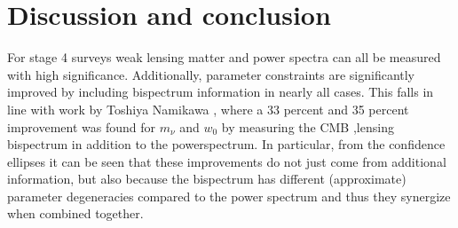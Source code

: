 \documentclass[11pt]{article} %
\begin{document}
\section{Discussion and conclusion}\label{sec:discussion}
For stage 4 surveys weak lensing matter and power spectra can all be measured with high significance. Additionally, parameter constraints are significantly improved by including bispectrum information in nearly all cases. This falls in line with work by Toshiya Namikawa \cite{Namikawa_2016}, where a 33 percent and 35 percent improvement was found for $m_\nu$ and $w_0$ by measuring the CMB ,lensing bispectrum in addition to the powerspectrum. In particular, from the confidence ellipses it can be seen that these improvements do not just come from additional information, but also because the bispectrum has different (approximate) parameter degeneracies compared to the power spectrum and thus they synergize when combined together.
\end{document}
